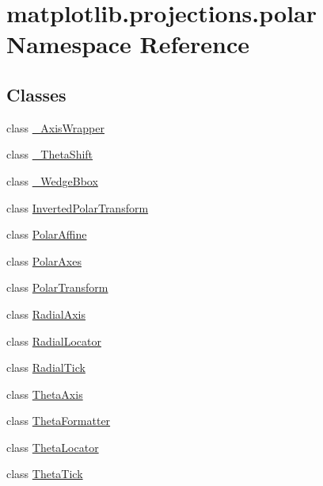 \hypertarget{namespacematplotlib_1_1projections_1_1polar}{}\section{matplotlib.\+projections.\+polar Namespace Reference}
\label{namespacematplotlib_1_1projections_1_1polar}
\subsection*{Classes}
\begin{DoxyCompactItemize}
\item 
class \hyperlink{classmatplotlib_1_1projections_1_1polar_1_1__AxisWrapper}{\+\_\+\+Axis\+Wrapper}
\item 
class \hyperlink{classmatplotlib_1_1projections_1_1polar_1_1__ThetaShift}{\+\_\+\+Theta\+Shift}
\item 
class \hyperlink{classmatplotlib_1_1projections_1_1polar_1_1__WedgeBbox}{\+\_\+\+Wedge\+Bbox}
\item 
class \hyperlink{classmatplotlib_1_1projections_1_1polar_1_1InvertedPolarTransform}{Inverted\+Polar\+Transform}
\item 
class \hyperlink{classmatplotlib_1_1projections_1_1polar_1_1PolarAffine}{Polar\+Affine}
\item 
class \hyperlink{classmatplotlib_1_1projections_1_1polar_1_1PolarAxes}{Polar\+Axes}
\item 
class \hyperlink{classmatplotlib_1_1projections_1_1polar_1_1PolarTransform}{Polar\+Transform}
\item 
class \hyperlink{classmatplotlib_1_1projections_1_1polar_1_1RadialAxis}{Radial\+Axis}
\item 
class \hyperlink{classmatplotlib_1_1projections_1_1polar_1_1RadialLocator}{Radial\+Locator}
\item 
class \hyperlink{classmatplotlib_1_1projections_1_1polar_1_1RadialTick}{Radial\+Tick}
\item 
class \hyperlink{classmatplotlib_1_1projections_1_1polar_1_1ThetaAxis}{Theta\+Axis}
\item 
class \hyperlink{classmatplotlib_1_1projections_1_1polar_1_1ThetaFormatter}{Theta\+Formatter}
\item 
class \hyperlink{classmatplotlib_1_1projections_1_1polar_1_1ThetaLocator}{Theta\+Locator}
\item 
class \hyperlink{classmatplotlib_1_1projections_1_1polar_1_1ThetaTick}{Theta\+Tick}
\end{DoxyCompactItemize}
